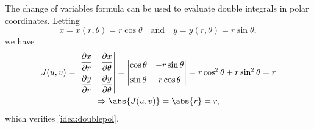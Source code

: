 The change of variables formula can be used to evaluate double integrals in polar coordinates. Letting
\[
 x = x(r,\theta) = r\cos \theta \quad \text{and} \quad y = y(r,\theta) = r\sin \theta ,
\]
we have
\begin{multline*}
 J(u,v) =
  \begin{vmatrix}
   \dfrac{\partial x}{\partial r} & \dfrac{\partial x}{\partial \theta}\vspace{2mm}\\
   \dfrac{\partial y}{\partial r} & \dfrac{\partial y}{\partial \theta}
  \end{vmatrix} =
  \begin{vmatrix}
   \cos \theta & -r\sin \theta\vspace{2mm}\\
   \sin \theta & r\cos \theta
  \end{vmatrix}= r\cos^2 \theta + r\sin^2 \theta = r \\
  \Rightarrow \abs{J(u,v)} = \abs{r} = r ,
\end{multline*}
which verifies \autoref{idea:doublepol}.
%
%
